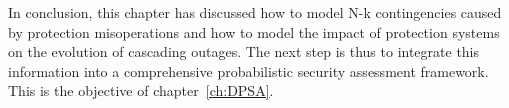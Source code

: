 In conclusion, this chapter has discussed how to model N-k contingencies caused by protection misoperations and how to model the impact of protection systems on the evolution of cascading outages. The next step is thus to integrate this information into a comprehensive probabilistic security assessment framework. This is the objective of chapter~\ref{ch:DPSA}.
